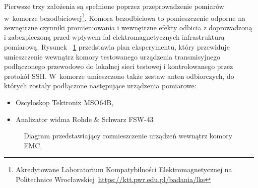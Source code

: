 Pierwsze trzy założenia są spełnione poprzez przeprowadzenie pomiarów w~komorze bezodbiciowej\footnote{Akredytowane Laboratorium Kompatybilności Elektromagnetycznej na Politechnice Wrocławskiej~\url{https://ktt.pwr.edu.pl/badania/lke}}. Komora bezodbiciowa to pomieszczenie odporne na zewnętrzne czynniki promieniowania i wewnętrzne efekty odbicia z doprowadzoną i zabezpieczoną przed wpływem fal elektromagnetycznych infrastrukturą pomiarową. Rysunek ~\ref{fig:router_diagram} przedstawia plan eksperymentu, który przewiduje umieszczenie  wewnątrz komory testowanego urządzenia transmisyjnego podłączonego przewodowo do lokalnej sieci testowej i kontrolowanego przez protokół SSH. W~komorze umieszczono także zestaw anten odbiorczych, do których zostały podłączone następujące urządzenia pomiarowe:
\begin{itemize}
    \item Oscyloskop Tektronix MSO64B,
    \item Analizator widma Rohde \& Schwarz FSW-43
\end{itemize}

\begin{figure}[!h]
\centering
{}
\caption{Diagram przedstawiający rozmieszczenie urządzeń wewnątrz komory EMC.}
\label{fig:router_diagram}
\end{figure}
